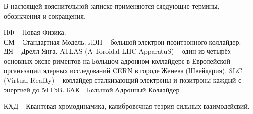 В настоящей пояснительной записке применяются следующие термины, обозначения и сокращения.

НФ – Новая Физика.\\

СМ – Стандартная Модель.
ЛЭП – большой электрон-позитронного коллайдер.
ДЯ – Дрелл-Янга.
ATLAS (A Toroidal LHC ApparatuS) – один из четырёх основных экспе-риментов на Большом адронном коллайдере в Европейской организации ядерных исследований CERN в городе Женева (Швейцария).
SLC (Virtual Reality) – коллайдер сталкивающий электроны и позитроны каждый с энергией до 50 ГэВ.
БАК - Большой Адронный Коллайдер

КХД -- Квантовая хромодинамика, калибровочная теория сильных взаимодейсвий.